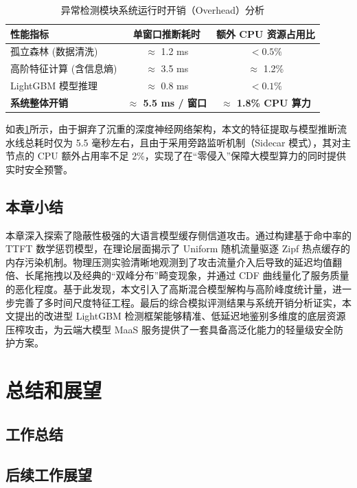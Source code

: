 \documentclass[master, vlined]{DissertUESTC}
\begin{document}
	\begin{table}[!ht]
		\caption{异常检测模块系统运行时开销（Overhead）分析} \label{tab: 检测模块系统开销}
		\begin{tabular}{l c c}
			\toprule
			\textbf{性能指标} & \textbf{单窗口推断耗时} & \textbf{额外 CPU 资源占用比} \\
			\midrule
			孤立森林 (数据清洗) & $\approx$ 1.2 ms & $< 0.5\%$ \\
			高阶特征计算 (含信息熵) & $\approx$ 3.5 ms & $\approx$ 1.2\% \\
			LightGBM 模型推理 & $\approx$ 0.8 ms & $< 0.1\%$ \\
			\midrule
			\textbf{系统整体开销} & \textbf{$\approx$ 5.5 ms / 窗口} & \textbf{$\approx$ 1.8\% CPU 算力} \\
			\bottomrule
		\end{tabular}
	\end{table}

	如表\ref{tab: 检测模块系统开销}所示，由于摒弃了沉重的深度神经网络架构，本文的特征提取与模型推断流水线总耗时仅为 5.5 毫秒左右，且由于采用旁路监听机制（Sidecar 模式），其对主节点的 CPU 额外占用率不足 2\%，实现了在“零侵入”保障大模型算力的同时提供实时安全预警。

	\section{本章小结}
	本章深入探索了隐蔽性极强的大语言模型缓存侧信道攻击。通过构建基于命中率的 TTFT 数学惩罚模型，在理论层面揭示了 Uniform 随机流量驱逐 Zipf 热点缓存的内存污染机制。物理压测实验清晰地观测到了攻击流量介入后导致的延迟均值翻倍、长尾拖拽以及经典的“双峰分布”畸变现象，并通过 CDF 曲线量化了服务质量的恶化程度。基于此发现，本文引入了高斯混合模型解构与高阶峰度统计量，进一步完善了多时间尺度特征工程。最后的综合模拟评测结果与系统开销分析证实，本文提出的改进型 LightGBM 检测框架能够精准、低延迟地鉴别多维度的底层资源压榨攻击，为云端大模型 MaaS 服务提供了一套具备高泛化能力的轻量级安全防护方案。

	\chapter{总结和展望}
	\section{工作总结}
	\section{后续工作展望}
	
\end{document}

